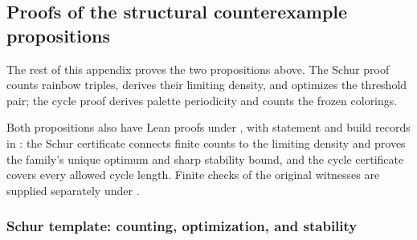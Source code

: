 \subsection{Proofs of the structural counterexample propositions}
\label{app:counterexample-structural-proofs}

The rest of this appendix proves the two propositions above. The Schur proof counts rainbow triples, derives their limiting density, and optimizes the threshold pair; the cycle proof derives palette periodicity and counts the frozen colorings.

Both propositions also have Lean proofs under , with statement and build records in : the Schur certificate connects finite counts to the limiting density and proves the family's unique optimum and sharp stability bound, and the cycle certificate covers every allowed cycle length. Finite checks of the original witnesses are supplied separately under .

\subsubsection{Schur template: counting, optimization, and stability}
\label{app:schur-template-proof}

